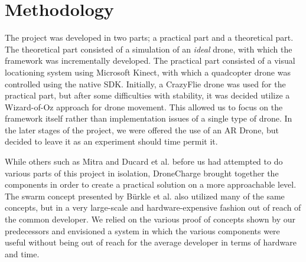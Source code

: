 \section{Methodology}
The project was developed in two parts; a practical part and a theoretical part. The theoretical part consisted of a simulation of an \textit{ideal} drone, with which the framework was incrementally developed. The practical part consisted of a visual locationing system using Microsoft Kinect, with which a quadcopter drone was controlled using the native SDK. Initially, a CrazyFlie drone was used for the practical part, but after some difficulties with stability, it was decided utilize a Wizard-of-Oz approach for drone movement. This allowed us to focus on the framework itself rather than implementation issues of a single type of drone.	In the later stages of the project, we were offered the use of an AR Drone, but decided to leave it as an experiment should time permit it.

While others such as Mitra and Ducard et al. before us had attempted to do various parts of this project in isolation, DroneCharge brought together the components in order to create a practical solution on a more approachable level. The swarm concept presented by B\"urkle et al. also utilized many of the same concepts, but in a very large-scale and hardware-expensive fashion out of reach of the common developer. We relied on the various proof of concepts shown by our predecessors and envisioned a system in which the various components were useful without being out of reach for the average developer in terms of hardware and time.
